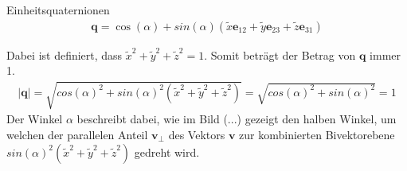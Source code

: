 \begin{definition}
	Einheitsquaternionen
	\begin{align}
		\mathbf{q} = \cos(\alpha) + sin(\alpha)(\tilde{x}\mathbf{e}_{12} + \tilde{y}\mathbf{e}_{23} + \tilde{z}\mathbf{e}_{31})
	\end{align}
\end{definition}
Dabei ist definiert, dass $\tilde{x}^2+\tilde{y}^2+\tilde{z}^2=1$. Somit beträgt der Betrag von $\mathbf{q}$ immer 1.
\begin{align}
	|\mathbf{q}| = \sqrt{cos(\alpha)^2 + sin(\alpha)^2(\tilde{x}^2+\tilde{y}^2+\tilde{z}^2) } = \sqrt{cos(\alpha)^2 + sin(\alpha)^2} = 1
\end{align}
Der Winkel $\alpha$ beschreibt dabei, wie im Bild (...) gezeigt den halben Winkel, um welchen der parallelen Anteil $\mathbf{v_{\perp}}$ des Vektors $\mathbf{v}$ zur kombinierten Bivektorebene $sin(\alpha)^2(\tilde{x}^2+\tilde{y}^2+\tilde{z}^2)$ gedreht wird.

